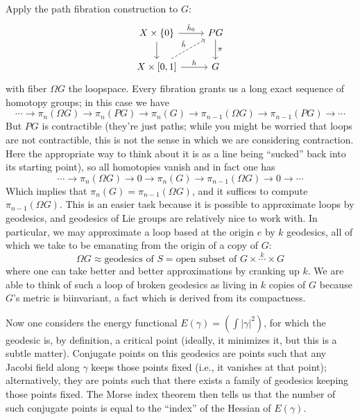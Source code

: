 \documentclass{report}
\begin{document}
Apply the path fibration construction to $ G $:
\begin{equation*}
	\begin{tikzcd}
	X\times \left\{0\right\} \arrow[r, "\tilde{h}_0"] \arrow[d]
		& PG \arrow[d, "\pi"] \\
	X\times\left[0, 1\right] \arrow[r, "h"] \arrow[from=2-1, to=1-2, "\tilde{h}", dashrightarrow]
		& G
	\end{tikzcd}
\end{equation*}
with fiber $ \Omega G $ the loopspace. Every fibration grants us a long exact 
sequence of homotopy groups; in this case we have 
\begin{equation*}
	\cdots \to \pi_n(\Omega G) \to \pi_n(PG) \to \pi_n(G) \to \pi_{n-1}(\Omega G) 
	\to \pi_{n-1}(PG)\to \cdots 
\end{equation*}
But $ PG $ is contractible (they're just paths; while you might be worried that 
loops are not contractible, this is not the sense in which we are considering 
contraction. Here the appropriate way to think about it is as a line being
``sucked'' back into its starting point), so all homotopies 
vanish and in fact one has 
\begin{equation}\label{eq:pi3-z-les}
	\cdots \to \pi_n(\Omega G) \to 0 \to \pi_n(G) \to \pi_{n-1}(\Omega G) 
	\to 0 \to \cdots 
\end{equation}
Which implies that $ \pi_n(G) = \pi_{n-1}(\Omega G) $, and it suffices to compute 
$ \pi_{n-1}(\Omega G) $. This is an easier task because it is possible to 
approximate loops by geodesics, and geodesics of Lie groups are relatively
nice to work with. In particular, we may approximate a loop based at the origin 
$ e $ by $ k $ geodesics, all of which we take to be emanating from the origin 
of a copy of $ G $:
\begin{equation*}
	\Omega G \approx \text{geodesics of } S =\text{open subset of } G\times \overset{k}{\cdots}\times G
\end{equation*}
where one can take better and better approximations by cranking up $ k $. 
We are able to think of such a loop of broken geodesics as living in $ k $ 
copies of $ G $ because $ G $'s metric is biinvariant, a fact which is derived 
from its compactness.

Now one considers the energy functional $ E (\gamma) = (\int |\gamma|^2) $, for
which the geodesic is, by definition, a critical point (ideally, it minimizes
it, but this is a subtle matter). Conjugate points on this geodesics are points
such that any Jacobi field along $ \gamma $ keeps those points fixed (i.e., 
it vanishes at that point); alternatively, they are points such that there
exists a family of geodesics keeping those points fixed. The Morse index theorem
then tells us that the
number of such conjugate points is equal to the ``index'' of the Hessian of $
E(\gamma) $. 
\end{document}
